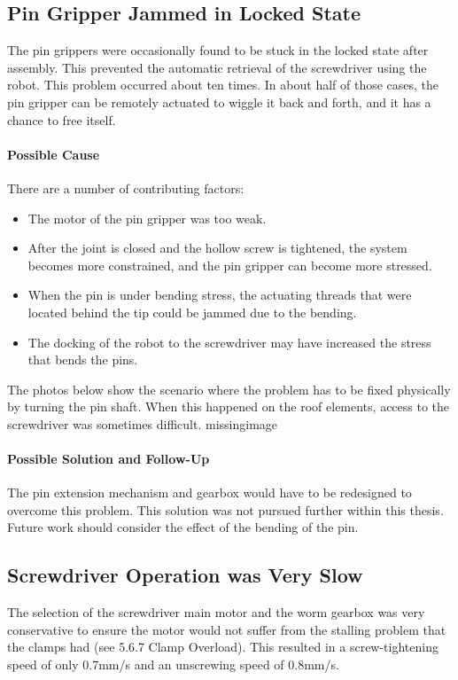 \subsection{Pin Gripper Jammed in Locked State}
The pin grippers were occasionally found to be stuck in the locked state after assembly. This prevented the automatic retrieval of the screwdriver using the robot. This problem occurred about ten times. In about half of those cases, the pin gripper can be remotely actuated to wiggle it back and forth, and it has a chance to free itself.

\paragraph{Possible Cause}
There are a number of contributing factors:
\begin{itemize}
    \item The motor of the pin gripper was too weak.
    \item After the joint is closed and the hollow screw is tightened, the system becomes more constrained, and the pin gripper can become more stressed.
    \item When the pin is under bending stress, the actuating threads that were located behind the tip could be jammed due to the bending.
    \item The docking of the robot to the screwdriver may have increased the stress that bends the pins.
\end{itemize}
The photos below show the scenario where the problem has to be fixed physically by turning the pin shaft. When this happened on the roof elements, access to the screwdriver was sometimes difficult.
missingimage

\paragraph{Possible Solution and Follow-Up}
The pin extension mechanism and gearbox would have to be redesigned to overcome this problem. This solution was not pursued further within this thesis. Future work should consider the effect of the bending of the pin.

\subsection{Screwdriver Operation was Very Slow}
The selection of the screwdriver main motor and the worm gearbox was very conservative to ensure the motor would not suffer from the stalling problem that the clamps had (see 5.6.7 Clamp Overload). This resulted in a screw-tightening speed of only 0.7mm/s and an unscrewing speed of 0.8mm/s. 

